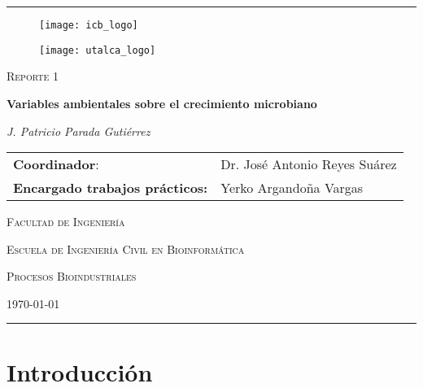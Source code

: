\documentclass[a4paper,12pt]{article}
\begin{document}
  \begin{titlepage}
    \centering
    \rule[1ex]{\textwidth}{0.8pt}

    \vspace{1cm}
    \begin{minipage}[b]{.45\linewidth}
      \begin{figure}[H]
        \raggedright
        \texttt{[image: icb\_logo]}
      \end{figure}
    \end{minipage}
    \begin{minipage}[b]{.45\linewidth}
      \begin{figure}[H]
        \raggedleft
        \texttt{[image: utalca\_logo]}
      \end{figure}
    \end{minipage}

    \vspace{2cm}

    {\large \scshape Reporte 1 \par}
    \vspace{1cm}
    {\Large \bfseries Variables ambientales sobre el crecimiento microbiano \par}
    \vspace{2cm}
    {\itshape J. Patricio Parada Gutiérrez \par}
    \vspace{2cm}

    \begin{tabular}{ll}
      \textbf{Coordinador}: & Dr. José Antonio Reyes Suárez \\
      \textbf{Encargado trabajos prácticos:} & Yerko Argandoña Vargas \\
    \end{tabular}

    \vfill
    {\scshape Facultad de Ingeniería \par}
    {\scshape Escuela de Ingeniería Civil en Bioinformática \par}
    {\scshape Procesos Bioindustriales \par}

    \vfill
    {\scshape \today \par}

    \vfill
    \rule{\textwidth}{0.8pt}

  \end{titlepage}

  \section{Introducción}
\end{document}
